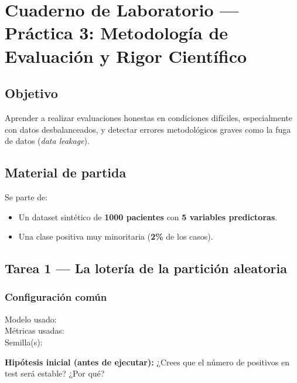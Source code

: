 \chapter{Cuaderno de Laboratorio — Práctica 3: Metodología de Evaluación y Rigor Científico}

\section*{Objetivo}
Aprender a realizar evaluaciones honestas en condiciones difíciles, especialmente con datos desbalanceados,
y detectar errores metodológicos graves como la fuga de datos (\textit{data leakage}).

\section*{Material de partida}
Se parte de:
\begin{itemize}
    \item Un dataset sintético de \textbf{1000 pacientes} con \textbf{5 variables predictoras}.
    \item Una clase positiva muy minoritaria (\textbf{2\%} de los casos).
\end{itemize}

\section{Tarea 1 — La lotería de la partición aleatoria}

\subsection*{Configuración común}
Modelo usado: \underline{\hspace{6cm}}\\
Métricas usadas: \underline{\hspace{5cm}}\\
Semilla(s): \underline{\hspace{8cm}}

\vspace{0.3cm}
\noindent\textbf{Hipótesis inicial (antes de ejecutar):}
¿Crees que el número de positivos en test será estable? ¿Por qué?
\vspace{1.2cm}

